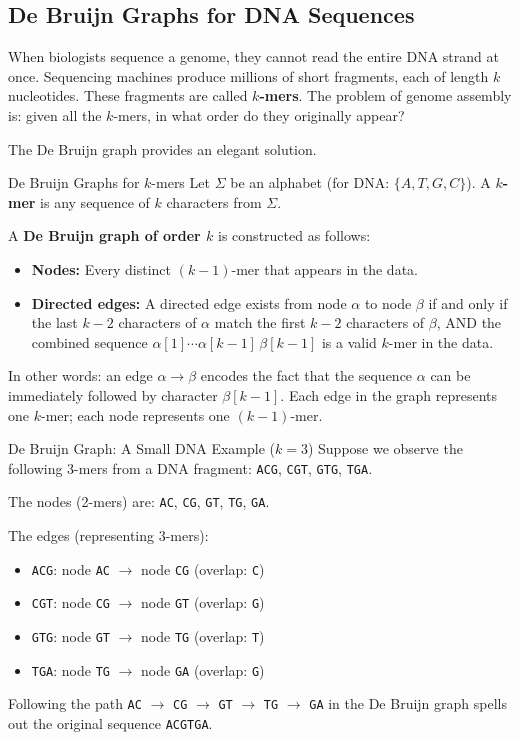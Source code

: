 \subsection{De Bruijn Graphs for DNA Sequences}

When biologists sequence a genome, they cannot read the entire DNA strand at once. Sequencing
machines produce millions of short fragments, each of length $k$ nucleotides. These fragments
are called \textbf{$k$-mers}. The problem of genome assembly is: given all the $k$-mers, in
what order do they originally appear?

The De Bruijn graph provides an elegant solution.

\begin{conceptbox}{De Bruijn Graphs for $k$-mers}
Let $\Sigma$ be an alphabet (for DNA: $\{A, T, G, C\}$). A \textbf{$k$-mer} is any sequence of
$k$ characters from $\Sigma$.

A \textbf{De Bruijn graph of order $k$} is constructed as follows:
\begin{itemize}[noitemsep]
    \item \textbf{Nodes:} Every distinct $(k-1)$-mer that appears in the data.
    \item \textbf{Directed edges:} A directed edge exists from node $\alpha$ to node $\beta$ if
          and only if the last $k-2$ characters of $\alpha$ match the first $k-2$ characters of
          $\beta$, AND the combined sequence $\alpha[1]\cdots\alpha[k-1]\,\beta[k-1]$ is a valid
          $k$-mer in the data.
\end{itemize}
In other words: an edge $\alpha \to \beta$ encodes the fact that the sequence $\alpha$ can be
immediately followed by character $\beta[k-1]$. Each edge in the graph represents one $k$-mer;
each node represents one $(k-1)$-mer.
\end{conceptbox}

\begin{examplebox}{De Bruijn Graph: A Small DNA Example ($k=3$)}
Suppose we observe the following 3-mers from a DNA fragment: \texttt{ACG}, \texttt{CGT},
\texttt{GTG}, \texttt{TGA}.

The nodes (2-mers) are: \texttt{AC}, \texttt{CG}, \texttt{GT}, \texttt{TG}, \texttt{GA}.

The edges (representing 3-mers):
\begin{itemize}[noitemsep]
    \item \texttt{ACG}: node \texttt{AC} $\to$ node \texttt{CG} \hfill (overlap: \texttt{C})
    \item \texttt{CGT}: node \texttt{CG} $\to$ node \texttt{GT} \hfill (overlap: \texttt{G})
    \item \texttt{GTG}: node \texttt{GT} $\to$ node \texttt{TG} \hfill (overlap: \texttt{T})
    \item \texttt{TGA}: node \texttt{TG} $\to$ node \texttt{GA} \hfill (overlap: \texttt{G})
\end{itemize}
Following the path \texttt{AC} $\to$ \texttt{CG} $\to$ \texttt{GT} $\to$ \texttt{TG} $\to$
\texttt{GA} in the De Bruijn graph spells out the original sequence \texttt{ACGTGA}.
\end{examplebox}

